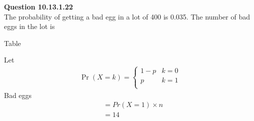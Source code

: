 \documentclass[journal,12pt,onecolumn]{IEEEtran}       \def\inputGnumericTable{}                                 %
\begin{document}
\let\pr\mathbf




\vspace{3cm}



\bigskip

\renewcommand{\thefigure}{\theenumi}
\renewcommand{\thetable}{\theenumi}


\textbf{Question 10.13.1.22}\\
The probability of getting a bad egg in a lot of 400 is 0.035. The number of bad eggs in the lot is
\solution
\begin{table}[!ht]
	
	\caption{Table}
	\label{tab:ncert/10/13/1/22/}	
\end{table}
Let 
\begin{align}
\Pr(X=k) = 
\begin{cases}
 1-p & k=0\\
p & k=1\\
\end{cases}
\end{align}	
Bad eggs
\begin{align}
&=Pr(X=1)\times{n}\\
&= 14
\end{align}   
\end{document}
